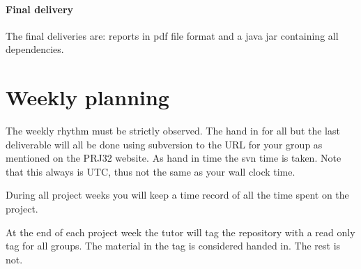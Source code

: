 \paragraph{Final delivery} The final deliveries are: reports in pdf file format and a java
jar containing all dependencies.


\section{Weekly planning}
The weekly rhythm must be strictly observed. The hand in for all but
the last deliverable will all be done using subversion to the URL
for your group as mentioned on the PRJ32 website. As hand in time the
svn time is taken. Note that this always is UTC, thus not the same as
your wall clock time.

During all project weeks you will keep a time record of all
the time spent on the project.

At the end of each project week the tutor will tag the repository with
a read only tag for all groups. The material in the tag is considered
handed in. The rest is not.

